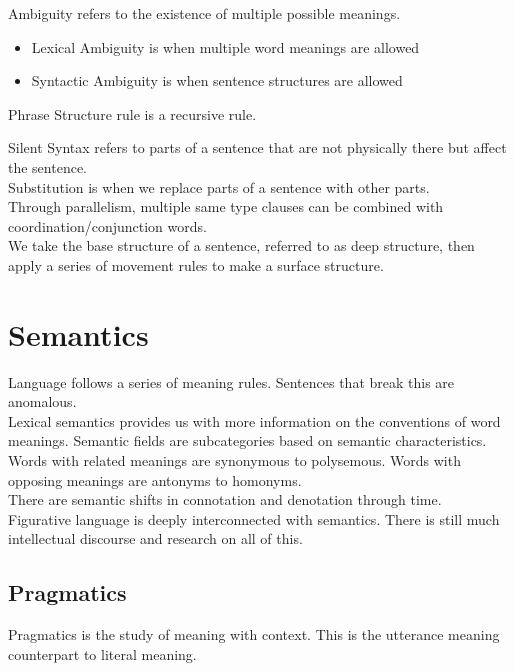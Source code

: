 \documentclass[12pt]{article}
\begin{document}
Ambiguity refers to the existence of multiple possible meanings.
\begin{itemize}
\item Lexical Ambiguity is when multiple word meanings are allowed
\item Syntactic Ambiguity is when sentence structures are allowed
\end{itemize}

Phrase Structure rule is a recursive rule.

Silent Syntax refers to parts of a sentence that are not physically there but affect the sentence. \\

Substitution is when we replace parts of a sentence with other parts. \\

Through parallelism, multiple same type clauses can be combined with coordination/conjunction words. \\

We take the base structure of a sentence, referred to as deep structure, then apply a series of movement rules to make a surface structure.

\section{Semantics}

Language follows a series of meaning rules. Sentences that break this are anomalous. \\

Lexical semantics provides us with more information on the conventions of word meanings. Semantic fields are subcategories based on semantic characteristics. \\

Words with related meanings are synonymous to polysemous. Words with opposing meanings are antonyms to homonyms. \\

There are semantic shifts in connotation and denotation through time. \\

Figurative language is deeply interconnected with semantics. There is still much intellectual discourse and research on all of this.

\subsection{Pragmatics}

Pragmatics is the study of meaning with context. This is the utterance meaning counterpart to literal meaning.
\end{document}
